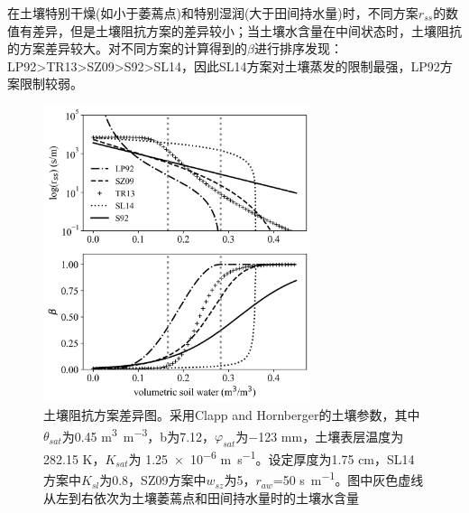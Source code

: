 在土壤特别干燥(如小于萎蔫点)和特别湿润(大于田间持水量)时，不同方案\(r_{ss}\)的数值有差异，但是土壤阻抗方案的差异较小；当土壤水含量在中间状态时，土壤阻抗的方案差异较大。对不同方案的计算得到的$\beta$进行排序发现：LP92\textgreater TR13\textgreater SZ09\textgreater S92\textgreater SL14，因此SL14方案对土壤蒸发的限制最强，LP92方案限制较弱。

{
\begin{figure}[htbp]
\centering
\includegraphics[width=0.7\textwidth]{Figures/地表湍流交换过程/土壤阻抗方案差异图.png}
\caption[土壤阻抗方案差异图]{土壤阻抗方案差异图。采用Clapp and Hornberger的土壤参数，其中\(\theta_{sat}\)为0.45 \unit{m^{3}.m^{-3}}，b为7.12，\(\varphi_{sat}\)为\num{-123} \unit {mm}，土壤表层温度为282.15 K，\(K_{sat}\)为 \num{1.25e-6} \unit{m.s^{-1}}。设定厚度为1.75 cm，SL14方案中\(K_{sl}\)为0.8，SZ09方案中\(w_{sz}\)为5，\(r_{aw}\)=50 \unit {s.m^{-1}}。图中灰色虚线从左到右依次为土壤萎蔫点和田间持水量时的土壤水含量}
\label{fig:土壤阻抗方案差异图}
\end{figure}
}

